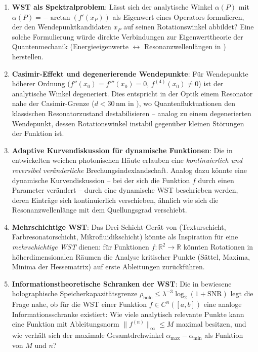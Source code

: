 ﻿\documentclass[12pt, a4paper]{article}
\theoremstyle{definition}
\begin{document}
	\begin{enumerate}[leftmargin=*, label=\textbf{F\arabic*.}]
		\item \textbf{WST als Spektralproblem}: Lässt sich der analytische Winkel
		$\alpha(P)$ mit $\alpha(P) = -\arctan(f'(x_P))$ als Eigenwert eines Operators
		formulieren, der den Wendepunktkandidaten $x_P$ auf seinen
		Rotationswinkel abbildet? Eine solche Formulierung würde direkte
		Verbindungen zur Eigenwerttheorie der Quantenmechanik (Energieeigenwerte
		$\leftrightarrow$ Resonanzwellenlängen in \cite{oqtum}) herstellen.
		
		\item \textbf{Casimir-Effekt und degenerierende Wendepunkte}: Für
		Wendepunkte höherer Ordnung ($f''(x_0) = f'''(x_0) = 0$,
		$f^{(4)}(x_0) \neq 0$) ist der analytische Winkel degeneriert.
		Dies entspricht in der Optik einem Resonator nahe der Casimir-Grenze
		($d < 30\,$nm in \cite{oqtum}), wo Quantenfluktuationen den
		klassischen Resonatorzustand destabilisieren -- analog zu einem
		degenerierten Wendepunkt, dessen Rotationswinkel instabil gegenüber
		kleinen Störungen der Funktion ist.
		
		\item \textbf{Adaptive Kurvendiskussion für dynamische Funktionen}: Die in
		\cite{oqtum} entwickelten weichen photonischen Häute erlauben eine
		\emph{kontinuierlich und reversibel veränderliche} Brechungsindexlandschaft.
		Analog dazu könnte eine dynamische Kurvendiskussion -- bei der sich die
		Funktion $f$ durch einen Parameter verändert -- durch eine dynamische
		WST beschrieben werden, deren Einträge sich kontinuierlich verschieben,
		ähnlich wie sich die Resonanzwellenlänge mit dem Quellungsgrad verschiebt.
		
		\item \textbf{Mehrschichtige WST}: Das Drei-Schicht-Gerät von \cite{oqtum}
		(Texturschicht, Farbresonatorschicht, Mikrofluidikschicht) könnte
		als Inspiration für eine \emph{mehrschichtige WST} dienen: für Funktionen
		$f: \mathbb{R}^2 \to \mathbb{R}$ könnten Rotationen in höherdimensionalen
		Räumen die Analyse kritischer Punkte (Sättel, Maxima, Minima der
		Hessematrix) auf erste Ableitungen zurückführen.
		
		\item \textbf{Informationstheoretische Schranken der WST}: Die in \cite{oqtum}
		bewiesene holographische Speicherkapazitätsgrenze
		$\rho_\mathrm{holo} \leq \lambda^{-3}\log_2(1+\mathrm{SNR})$
		legt die Frage nahe, ob für die WST einer Funktion $f \in C^n([a,b])$
		eine analoge Informationsschranke existiert: Wie viele analytisch
		relevante Punkte kann eine Funktion mit Ableitungsnorm $\|f^{(n)}\|_\infty \leq M$
		maximal besitzen, und wie verhält sich der maximale Gesamtdrehwinkel
		$\alpha_\mathrm{max} - \alpha_\mathrm{min}$ als Funktion von $M$ und $n$?
		

\end{enumerate}
\end{document}
